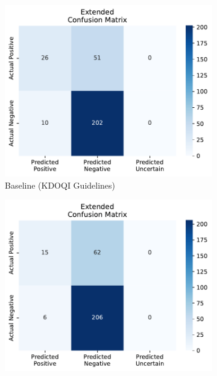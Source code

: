 \documentclass{ieeeaccess}
\begin{document}
\begin{figure}[H]
    \centering
    \begin{subfigure}[b]{0.32\textwidth} %
        \centering
        \includegraphics[width=\linewidth]{new_kdoqi_AVG.pdf}
        \caption{Baseline (KDOQI Guidelines)}
        \label{fig:vascular-access}
    \end{subfigure}
    \hfill %
    \begin{subfigure}[b]{0.32\textwidth}
        \centering
        \includegraphics[width=\linewidth]{new_without_AVG.pdf}

\end{subfigure}
\end{figure}
\end{document}
